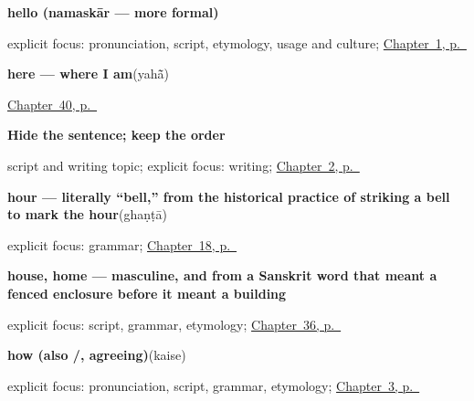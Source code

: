 \noindent\begin{minipage}[t]{\linewidth}
\raggedright
\textbf{hello (namaskār — more formal)}\enspace\emph{}\par
\footnotesize explicit focus: pronunciation, script, etymology, usage and culture; \hyperref[ch:greetings]{Chapter~1, p.~\pageref*{ch:greetings}}
\end{minipage}\par\smallskip

\noindent\begin{minipage}[t]{\linewidth}
\raggedright
\textbf{here — where I am}\enspace\emph{}\enspace(yahā̃)\par
\footnotesize \hyperref[ch:hi-pointing-and-asking]{Chapter~40, p.~\pageref*{ch:hi-pointing-and-asking}}
\end{minipage}\par\smallskip

\noindent\begin{minipage}[t]{\linewidth}
\raggedright
\textbf{Hide the sentence; keep the order}\par
\footnotesize script and writing topic; explicit focus: writing; \hyperref[ch:introductions]{Chapter~2, p.~\pageref*{ch:introductions}}
\end{minipage}\par\smallskip

\noindent\begin{minipage}[t]{\linewidth}
\raggedright
\textbf{hour — literally \textquotedblleft{}bell,\textquotedblright{} from the historical practice of striking a bell to mark the hour}\enspace\emph{}\enspace(ghaṇṭā)\par
\footnotesize explicit focus: grammar; \hyperref[ch:hi-telling-time]{Chapter~18, p.~\pageref*{ch:hi-telling-time}}
\end{minipage}\par\smallskip

\noindent\begin{minipage}[t]{\linewidth}
\raggedright
\textbf{house, home — masculine, and from a Sanskrit word that meant a fenced enclosure before it meant a building}\enspace\emph{}\par
\footnotesize explicit focus: script, grammar, etymology; \hyperref[ch:hi-one-house-four-languages]{Chapter~36, p.~\pageref*{ch:hi-one-house-four-languages}}
\end{minipage}\par\smallskip

\noindent\begin{minipage}[t]{\linewidth}
\raggedright
\textbf{how (also /, agreeing)}\enspace\emph{}\enspace(kaise)\par
\footnotesize explicit focus: pronunciation, script, grammar, etymology; \hyperref[ch:responding]{Chapter~3, p.~\pageref*{ch:responding}}
\end{minipage}\par\smallskip


